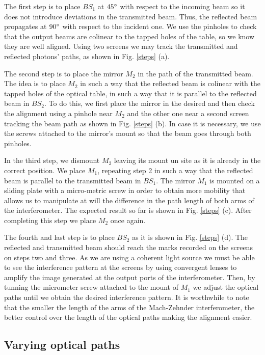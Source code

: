 \documentclass[12pt]{book}
\begin{document}
The first step is to place $BS_{1}$ at $45\degree$ with respect to the incoming beam so it does not introduce deviations in the transmitted beam. Thus, the reflected beam propagates at $90\degree$ with respect to the incident one. We use the pinholes to check that the output beams are colinear to the tapped holes of the table, so we know they are well aligned. Using two screens we may track the transmitted and reflected photons' paths, as shown in Fig. \ref{steps} (a).

The second step is to place the mirror $M_{2}$ in the path of the transmitted beam. The idea is to place $M_{2}$ in such a way that the reflected beam is colinear with the tapped holes of the optical table, in such a way that it is parallel to the reflected beam in $BS_{2}$. To do this, we first place the mirror in the desired and then check the alignment using a pinhole near $M_{2}$ and the other one near a second screen tracking the beam path as shown in Fig. \ref{steps} (b). In case it is necessary, we use the screws attached to the mirror's mount so that the beam goes through both pinholes.

In the third step, we dismount $M_{2}$ leaving its mount un site as it is already in the correct position. We place $M_{1}$, repeating step 2 in such a way that the reflected beam is parallel to the transmitted beam in $BS_{1}$. The mirror $M_{1}$ is mounted on a sliding plate with a micro-metric screw in order to obtain more mobility that allows us to manipulate at will the difference in the path length of both arms of the interferometer. The expected result so far is shown in Fig. \ref{steps} (c). After completing this step we place $M_{2}$ once again.

The fourth and last step is to place $BS_{2}$ as it is shown in Fig. \ref{steps} (d). The reflected and transmitted beam should reach the marks recorded on the screens on steps two and three. As we are using a coherent light source we must be able to see the interference pattern at the screens by using convergent lenses to amplify the image generated at the output ports of the interferometer. Then, by tunning the micrometer screw attached to the mount of $M_{1}$  we adjust the optical paths until we obtain the desired interference pattern. It is worthwhile to note that the smaller the length of the arms of the Mach-Zehnder interferometer, the better control over the length of the optical paths making the alignment easier.


\subsection{Varying optical paths}
\end{document}
